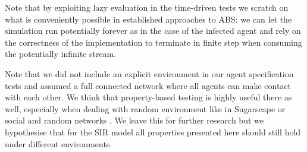 Note that by exploiting lazy evaluation in the time-driven tests we scratch on what is conveniently possible in established approaches to ABS: we can let the simulation run potentially forever as in the case of the infected agent and rely on the correctness of the implementation to terminate in finite step when consuming the potentially infinite stream.

Note that we did not include an explicit environment in our agent specification tests and assumed a full connected network where all agents can make contact with each other. We think that property-based testing is highly useful there as well, especially when dealing with random environment like in Sugarscape or social and random networks \cite{jackson_social_2008, easley_networks_2010}. We leave this for further research but we hypothesise that for the SIR model all properties presented here should still hold under different environments.
